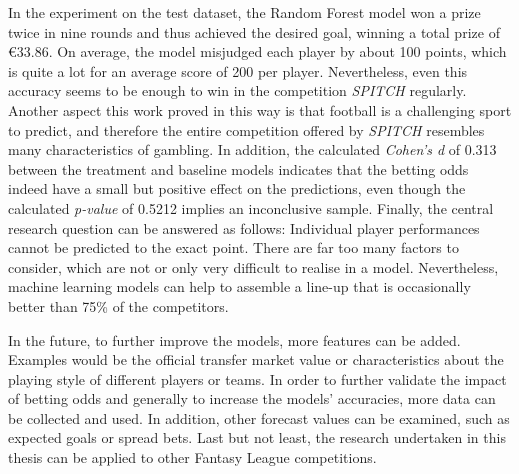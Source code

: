 In the experiment on the test dataset, the Random Forest model won a prize twice in nine rounds and thus achieved the desired goal, winning a total prize of €33.86. On average, the model misjudged each player by about 100 points, which is quite a lot for an average score of 200 per player. Nevertheless, even this accuracy seems to be enough to win in the competition \emph{SPITCH} regularly. Another aspect this work proved in this way is that football is a challenging sport to predict, and therefore the entire competition offered by \emph{SPITCH} resembles many characteristics of gambling. In addition, the calculated \emph{Cohen's d} of 0.313 between the treatment and baseline models indicates that the betting odds indeed have a small but positive effect on the predictions, even though the calculated \emph{p-value} of 0.5212 implies an inconclusive sample. Finally, the central research question can be answered as follows: Individual player performances cannot be predicted to the exact point. There are far too many factors to consider, which are not or only very difficult to realise in a model. Nevertheless, machine learning models can help to assemble a line-up that is occasionally better than 75\% of the competitors.

In the future, to further improve the models, more features can be added. Examples would be the official transfer market value or characteristics about the playing style of different players or teams. In order to further validate the impact of betting odds and generally to increase the models' accuracies, more data can be collected and used. In addition, other forecast values can be examined, such as expected goals or spread bets. Last but not least, the research undertaken in this thesis can be applied to other Fantasy League competitions.